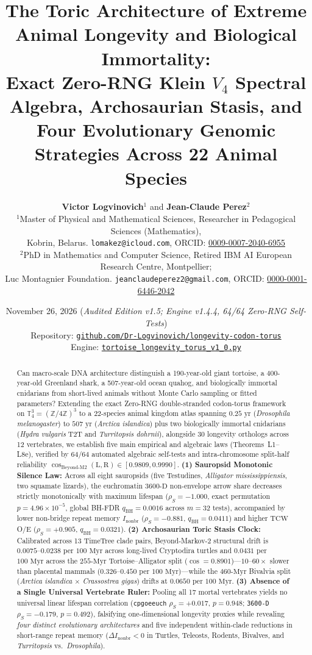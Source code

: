 \documentclass[11pt,a4paper]{article}
\title{\textbf{The Toric Architecture of Extreme Animal Longevity and Biological Immortality:}\\
\large Exact Zero-RNG Klein $V_4$ Spectral Algebra, Archosaurian Stasis, and Four Evolutionary Genomic Strategies Across 22 Animal Species}
\author{%
\textbf{Victor Logvinovich}$^{1}$ and \textbf{Jean-Claude Perez}$^{2}$\\[6pt]
\small $^{1}$Master of Physical and Mathematical Sciences, Researcher in Pedagogical Sciences (Mathematics),\\
\small Kobrin, Belarus. \texttt{lomakez@icloud.com}, ORCID: \href{https://orcid.org/0009-0007-2040-6955}{0009-0007-2040-6955}\\[4pt]
\small $^{2}$PhD in Mathematics and Computer Science, Retired IBM AI European Research Centre, Montpellier;\\
\small Luc Montagnier Foundation. \texttt{jeanclaudeperez2@gmail.com}, ORCID: \href{https://orcid.org/0000-0001-6446-2042}{0000-0001-6446-2042}
}
\date{November 26, 2026 \quad (\textit{Audited Edition v1.5; Engine v1.4.4, 64/64 Zero-RNG Self-Tests})\\[4pt]
\small Repository: \href{https://github.com/Dr-Logvinovich/longevity-codon-torus}{\nolinkurl{github.com/Dr-Logvinovich/longevity-codon-torus}}\\
\small Engine: \href{https://github.com/Dr-Logvinovich/longevity-codon-torus/blob/main/tortoise_longevity_torus_v1_0.py}{\nolinkurl{tortoise_longevity_torus_v1_0.py}}}
\renewcommand{\_}{\origunderscore\penalty200\relax}
\theoremstyle{remark}
\begin{document}
\maketitle

\begin{abstract}
Can macro-scale DNA architecture distinguish a 190-year-old giant tortoise, a 400-year-old Greenland shark, a 507-year-old ocean quahog, and biologically immortal cnidarians from short-lived animals without Monte Carlo sampling or fitted parameters?
Extending the exact Zero-RNG double-stranded codon-torus framework on $\mathbb{T}_4^3 = (\mathbb{Z}/4\mathbb{Z})^3$ to a 22-species animal kingdom atlas spanning $0.25\text{ yr}$ (\textit{Drosophila melanogaster}) to $507\text{ yr}$ (\textit{Arctica islandica}) plus two biologically immortal cnidarians (\textit{Hydra vulgaris} T2T and \textit{Turritopsis dohrnii}), alongside 30 longevity orthologs across 12 vertebrates, we establish five main empirical and algebraic laws (Theorems~L1--L8e), verified by 64/64 automated algebraic self-tests and intra-chromosome split-half reliability $\cos_{\mathrm{Beyond\text{-}M2}}(\mathrm{L},\mathrm{R}) \in [0.9809, 0.9990]$.
\textbf{(1) Sauropsid Monotonic Silence Law:} Across all eight sauropsids (five Testudines, \textit{Alligator mississippiensis}, two squamate lizards), the euchromatin $3600\text{-D}$ non-envelope arrow share decreases strictly monotonically with maximum lifespan ($\rho_S = -1.000$, exact permutation $p = 4.96 \times 10^{-5}$, global BH-FDR $q_{\mathrm{BH}} = 0.0016$ across $m=32$ tests), accompanied by lower non-bridge repeat memory $I_{\mathrm{nonbr}}$ ($\rho_S = -0.881$, $q_{\mathrm{BH}} = 0.0411$) and higher $\mathrm{TCW}$ O/E ($\rho_S = +0.905$, $q_{\mathrm{BH}} = 0.0321$).
\textbf{(2) Archosaurian Toric Stasis Clock:} Calibrated across 13 TimeTree clade pairs, Beyond-Markov-2 structural drift is $0.0075\text{--}0.0238$ per $100\text{ Myr}$ across long-lived Cryptodira turtles and $0.0431$ per $100\text{ Myr}$ across the $255\text{-Myr}$ Tortoise--Alligator split ($\cos = 0.8901$)---$10\text{--}60\times$ slower than placental mammals ($0.326\text{--}0.450$ per $100\text{ Myr}$)---while the $460\text{-Myr}$ Bivalvia split (\textit{Arctica islandica} $\times$ \textit{Crassostrea gigas}) drifts at $0.0650$ per $100\text{ Myr}$.
\textbf{(3) Absence of a Single Universal Vertebrate Ruler:} Pooling all 17 mortal vertebrates yields no universal linear lifespan correlation (\texttt{cpg\_oe\_euch} $\rho_S = +0.017$, $p = 0.948$; \texttt{3600-D} $\rho_S = -0.179$, $p = 0.492$), falsifying one-dimensional longevity proxies while revealing \emph{four distinct evolutionary architectures} and five independent within-clade reductions in short-range repeat memory ($\Delta I_{\mathrm{nonbr}} < 0$ in Turtles, Teleosts, Rodents, Bivalves, and \textit{Turritopsis} vs.\ \textit{Drosophila}).

\end{abstract}
\end{document}
